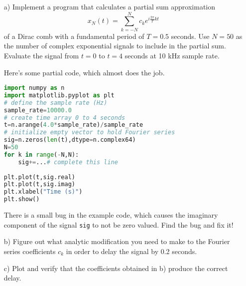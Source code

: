 \begin{itemize}
\item[a)] Implement a program that calculates a partial sum
  approximation
  \begin{equation}
    x_N(t) = \sum_{k=-N}^{N} c_k e^{i \frac{2\pi}{T}kt}
\end{equation}
  of a Dirac comb with a fundamental period of $T=0.5$ seconds. Use
  $N=50$ as the number of complex exponential signals to include in
  the partial sum. Evaluate the signal from $t=0$ to $t=4$ seconds at 10
  kHz sample rate. 

  Here's some partial code, which almost does the
  job. 
\begin{lstlisting}[language=Python,numbers=none]
import numpy as n
import matplotlib.pyplot as plt
# define the sample rate (Hz)
sample_rate=10000.0
# create time array 0 to 4 seconds
t=n.arange(4.0*sample_rate)/sample_rate
# initialize empty vector to hold Fourier series
sig=n.zeros(len(t),dtype=n.complex64)
N=50
for k in range(-N,N):
    sig+=...# complete this line
    
plt.plot(t,sig.real)
plt.plot(t,sig.imag)
plt.xlabel("Time (s)")
plt.show()
\end{lstlisting}
There is a small bug in the example code, which causes the imaginary
  component of the signal \verb|sig| to not be zero valued. Find the
  bug and fix it!

\item[b)] Figure out what analytic modification you need to make to the Fourier series coefficients $c_k$ in order to delay the signal by 0.2 seconds.

\item[c)] Plot and verify that the coefficients obtained in b) produce the correct delay.

\end{itemize}